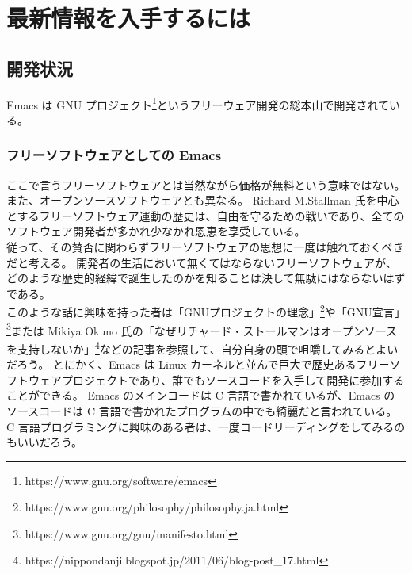 \chapter{最新情報を入手するには}
\section{開発状況}
Emacs は GNU プロジェクト\footnote{https://www.gnu.org/software/emacs}というフリーウェア開発の総本山で開発されている。
\subsection{フリーソフトウェアとしての Emacs}
ここで言うフリーソフトウェアとは当然ながら価格が無料という意味ではない。
また、オープンソースソフトウェアとも異なる。
Richard M.Stallman 氏を中心とするフリーソフトウェア運動の歴史は、自由を守るための戦いであり、全てのソフトウェア開発者が多かれ少なかれ恩恵を享受している。\\

従って、その賛否に関わらずフリーソフトウェアの思想に一度は触れておくべきだと考える。
開発者の生活において無くてはならないフリーソフトウェアが、どのような歴史的経緯で誕生したのかを知ることは決して無駄にはならないはずである。\\

このような話に興味を持った者は「GNUプロジェクトの理念」\footnote{https://www.gnu.org/philosophy/philosophy.ja.html}や「GNU宣言」\footnote{https://www.gnu.org/gnu/manifesto.html}または Mikiya Okuno 氏の「なぜリチャード・ストールマンはオープンソースを支持しないか」\footnote{https://nippondanji.blogspot.jp/2011/06/blog-post\_17.html}などの記事を参照して、自分自身の頭で咀嚼してみるとよいだろう。
とにかく、Emacs は Linux カーネルと並んで巨大で歴史あるフリーソフトウェアプロジェクトであり、誰でもソースコードを入手して開発に参加することができる。
Emacs のメインコードは C 言語で書かれているが、Emacs のソースコードは C 言語で書かれたプログラムの中でも綺麗だと言われている。
C 言語プログラミングに興味のある者は、一度コードリーディングをしてみるのもいいだろう。
